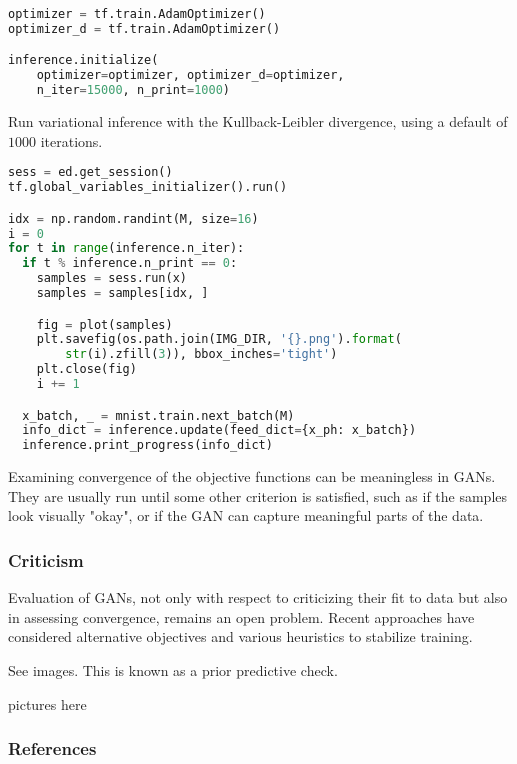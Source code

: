 \begin{lstlisting}[language=Python]
optimizer = tf.train.AdamOptimizer()
optimizer_d = tf.train.AdamOptimizer()

inference.initialize(
    optimizer=optimizer, optimizer_d=optimizer,
    n_iter=15000, n_print=1000)
\end{lstlisting}

Run variational inference with the Kullback-Leibler divergence, using a
default of $1000$ iterations.
\begin{lstlisting}[language=Python]
sess = ed.get_session()
tf.global_variables_initializer().run()

idx = np.random.randint(M, size=16)
i = 0
for t in range(inference.n_iter):
  if t % inference.n_print == 0:
    samples = sess.run(x)
    samples = samples[idx, ]

    fig = plot(samples)
    plt.savefig(os.path.join(IMG_DIR, '{}.png').format(
        str(i).zfill(3)), bbox_inches='tight')
    plt.close(fig)
    i += 1

  x_batch, _ = mnist.train.next_batch(M)
  info_dict = inference.update(feed_dict={x_ph: x_batch})
  inference.print_progress(info_dict)
\end{lstlisting}

Examining convergence of the objective functions can be meaningless in
GANs. They are usually run until some other criterion is satisfied,
such as if the samples look visually "okay", or if the GAN can capture
meaningful parts of the data.

\subsubsection{Criticism}

Evaluation of GANs, not only with respect to criticizing their fit to
data but also in assessing convergence, remains an open problem.
Recent approaches have considered alternative objectives and various
heuristics to stabilize training.

See images. This is known as a prior predictive check.

pictures here

\subsubsection{References}\label{references}
